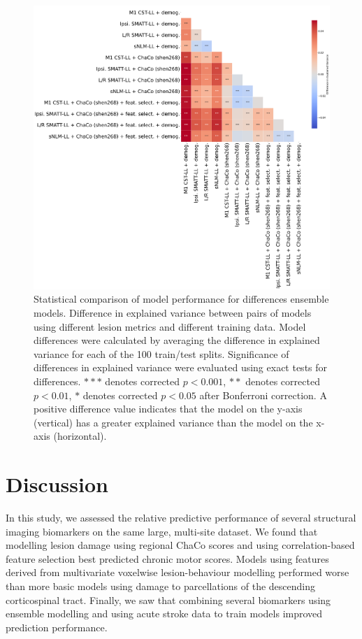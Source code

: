 \documentclass[10pt]{article}
\begin{document}
\begin{figure}[htp]
\centering
\includegraphics[width=1\linewidth]{figures/Analysis2_matrix.png}
\caption{Statistical comparison of model performance for differences ensemble models. Difference in explained variance between pairs of models using different lesion metrics and different training data. Model differences were calculated by averaging the difference in explained variance for each of the 100 train/test splits. Significance of differences in explained variance were evaluated using exact tests for differences. $***$ denotes corrected $p < 0.001$, $**$ denotes corrected $p < 0.01$, $*$ denotes corrected $p < 0.05$ after Bonferroni correction. A positive difference value indicates that the model on the y-axis (vertical) has a greater explained variance than the model on the x-axis (horizontal).}
\label{analysis2_matrix}
\end{figure}

\section{Discussion}
In this study, we assessed the relative predictive performance of several structural imaging biomarkers on the same large, multi-site dataset. We found that modelling lesion damage using regional ChaCo scores and using correlation-based feature selection best predicted chronic motor scores. Models using features derived from multivariate voxelwise lesion-behaviour modelling performed worse than more basic models using damage to parcellations of the descending corticospinal tract. Finally, we saw that combining several biomarkers using ensemble modelling and using acute stroke data to train models improved prediction performance.
\end{document}

